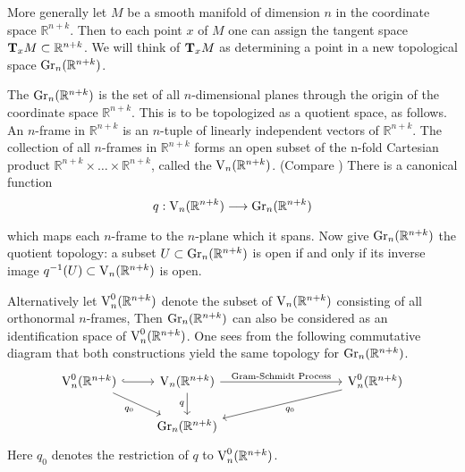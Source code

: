 \documentclass[../main]{subfiles}
\begin{document}
More generally let $M$ be a smooth manifold of dimension $n$ in the coordinate space $\mathbb{R}^{n+k}$. Then to each point $x$ of $M$ one can assign the tangent space \newline $\tangentspace{M}{x} \subset \mathbb{R}^{n+k}$. We will think of $\tangentspace{M}{x}$ as determining a point in a new topological space $\grassmannian_n (\mathbb{R}^{n+k})$.
\begin{definition}\label{def:5-1}
The  $\grassmannian_n (\mathbb{R}^{n+k})$ is the set of all $n$-dimensional planes through the origin of the coordinate space $\mathbb{R}^{n+k}$. This is to be topologized as a quotient space, as follows.
An $n$-frame in $\mathbb{R}^{n+k}$ is an $n$-tuple of linearly independent vectors of $\mathbb{R}^{n+k}$. The collection of all $n$-frames in $\mathbb{R}^{n+k}$ forms an open subset of the n-fold Cartesian product $\mathbb{R}^{n+k} \times \dots \times \mathbb{R}^{n+k}$, called the  $\StiefelManifold_n(\mathbb{R}^{n+k}) $. (Compare \cite[$\S$7.7]{steenrod1951}) There is a canonical function
\[q:\StiefelManifold_n(\mathbb{R}^{n+k})\varrightarrow{}\grassmannian_n (\mathbb{R}^{n+k}) \]
which maps each $n$-frame to the $n$-plane which it spans. Now give $\grassmannian_n (\mathbb{R}^{n+k})$ the quotient topology: a subset $U \subset \grassmannian_n (\mathbb{R}^{n+k})$ is open if and only if its inverse image $q^{-1}(U) \subset \StiefelManifold_n(\mathbb{R}^{n+k})$ is open.

Alternatively let $\StiefelManifold_n^0(\mathbb{R}^{n+k})$ denote the subset of $\StiefelManifold_n(\mathbb{R}^{n+k})$ consisting of all orthonormal $n$-frames, Then $\grassmannian_n (\mathbb{R}^{n+k})$ can also be considered as an identification space of $\StiefelManifold_n^0(\mathbb{R}^{n+k})$. One sees from the following
commutative diagram that both constructions yield the same topology for $\grassmannian_n (\mathbb{R}^{n+k})$.
\[\begin{tikzcd}
	\StiefelManifold_n^0(\mathbb{R}^{n+k}) \arrow[r, hook] \arrow[rd, "q_0"'] & \StiefelManifold_n(\mathbb{R}^{n+k}) \arrow[d, "q"'] \arrow[rrrr, "\text{Gram-Schmidt Process}"] &  &  & & \StiefelManifold_n^0(\mathbb{R}^{n+k}) \arrow[lllld, "q_0"] \\
	& \grassmannian_n (\mathbb{R}^{n+k})                                                         &  &  &   &                                     
\end{tikzcd}\]
Here $q_0$ denotes the restriction of $q$ to $\StiefelManifold_n^0(\mathbb{R}^{n+k})$.	
\end{definition}
\end{document}

